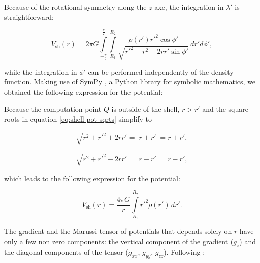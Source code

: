 \documentclass[extra]{gji}
\begin{document}
\noindent
Because of the rotational symmetry along the $z$ axe, the integration in $\lambda'$ is
straightforward:

\begin{equation}
    V_\text{sh}(r) = 2\pi G
    \int\limits_{-\frac{\pi}{2}}^\frac{\pi}{2}
    \int\limits_{R_1}^{R_2}
    \frac{\rho(r') {r'}^2 \cos\phi'}{\sqrt{r'^2 + r^2 - 2 r r' \sin\phi'}}
    \, dr' d\phi',
\end{equation}

\noindent
while the integration in $\phi'$ can be performed independently of the density function.
Making use of SymPy \citep{sympy2017}, a Python library for symbolic mathematics, we
obtained the following expression for the potential:


Because the computation point $Q$ is outside of the shell, $r > r'$ and the square roots
in equation \ref{eq:shell-pot-sqrts} simplify to

\begin{equation}
    \sqrt{r^2 + r'^2 + 2rr'} = |r + r'| = r + r',
\end{equation}

\begin{equation}
    \sqrt{r^2 + r'^2 - 2rr'} = |r - r'| = r - r',
\end{equation}

\noindent which leads to the following expression for the potential:

\begin{equation}
    V_\text{sh}(r) = \frac{4\pi G}{r}
    \int\limits_{R_1}^{R_2} {r'}^2 \rho(r') \, dr'.
\label{eq:shell-pot}
\end{equation}

The gradient and the Marussi tensor of potentials that
depends solely on $r$ have only a few non zero components: the vertical
component of the gradient ($g_z$) and the diagonal components of the
tensor ($g_{xx}$, $g_{yy}$, $g_{zz}$).
Following \citet{Grombein2013}:
\end{document}
